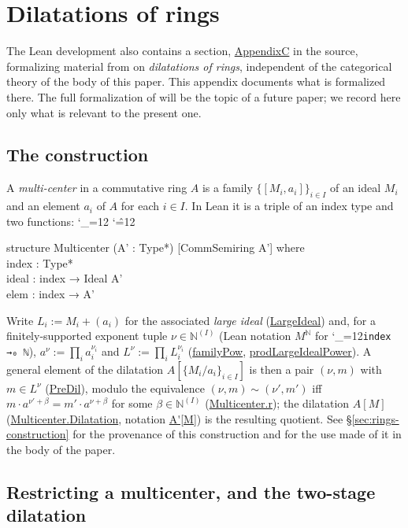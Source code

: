 \documentclass[11pt]{amsart}
\newcommand{\lc}[1]{\url{#1}}
\newcommand{\lcode}{\begingroup\catcode`\_=12\relax\lcodeInner}
\newcommand{\lcodeInner}[1]{\texttt{#1}\endgroup}
\newenvironment{leancode}{%
  \begingroup
  \catcode`\_=12\relax
  \catcode`\^=12\relax
  \small\ttfamily\raggedright\baselineskip=1.15\baselineskip
  \par\smallskip\noindent
}{%
  \par\smallskip
  \endgroup
}
\theoremstyle{plain}
\theoremstyle{definition}
\theoremstyle{remark}
\begin{document}
\section{Dilatations of rings}
\label{app:ring-elementary}

The Lean development also contains a section, \lc{AppendixC} in the source, formalizing
material from \citep[\S 2.2]{M} on \emph{dilatations of rings}, independent of the
categorical theory of the body of this paper. This appendix documents what is formalized
there. The full formalization of \citep{M} will be the topic of a future paper; we record
here only what is relevant to the present one.

\subsection{The construction}
\label{sec:appC-construction}

A \emph{multi-center} in a commutative ring $A$ is a family $\{[M_i,a_i]\}_{i\in I}$ of an
ideal $M_i$ and an element $a_i$ of $A$ for each $i \in I$. In Lean it is a triple of an
index type and two functions:
\begin{leancode}
structure Multicenter (A' : Type*) [CommSemiring A'] where \\
  index : Type* \\
  ideal : index → Ideal A' \\
  elem : index → A' \\
\end{leancode}
Write $L_i := M_i+(a_i)$ for the associated \emph{large ideal} (\lc{LargeIdeal}) and, for a
finitely-supported exponent tuple $\nu \in \mathbb N^{(I)}$ (Lean notation $M^{\mathbb N}$
for \lcode{index →₀ ℕ}), $a^\nu := \prod_i a_i^{\nu_i}$ and $L^\nu := \prod_i L_i^{\nu_i}$
(\lc{familyPow}, \lc{prodLargeIdealPower}). A general element of the dilatation
$A[\{M_i/a_i\}_{i\in I}]$ is then a pair $(\nu,m)$ with $m \in L^\nu$ (\lc{PreDil}), modulo
the equivalence $(\nu,m)\sim(\nu',m')$ iff $m\cdot a^{\nu'+\beta} = m'\cdot a^{\nu+\beta}$
for some $\beta\in\mathbb N^{(I)}$ (\lc{Multicenter.r}); the dilatation $A[M]$
(\lc{Multicenter.Dilatation}, notation \lc{A'[M]}) is the resulting quotient. See
\S\ref{sec:rings-construction} for the provenance of this construction and for the use made
of it in the body of the paper.

\subsection{Restricting a multicenter, and the two-stage dilatation}
\label{sec:appC-restrict}
\end{document}
